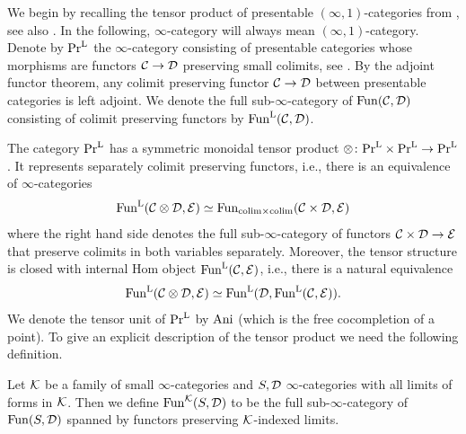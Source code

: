 We begin by recalling the tensor product of presentable $(\infty,1)$-categories from \cite[Section 4.8.1]{Lurie2017},
see also \cite[Section 0713]{Kerodon2026}.
In the following, $\infty$-category will always mean $(\infty,1)$-category.
Denote by $\mathrm{Pr}^\mathrm{L}$ the $\infty$-category consisting of presentable categories
whose morphisms are functors $\mathcal{C}\to\mathcal{D}$ preserving small colimits, see \cite[Section 5.5]{Lurie2009}.
By the adjoint functor theorem, any colimit preserving functor $\mathcal{C}\to\mathcal{D}$ between presentable categories is left adjoint.
We denote the full sub-$\infty$-category of $\operatorname{Fun}(\mathcal{C},\mathcal{D})$ consisting of colimit preserving functors by $\operatorname{Fun}^{\mathrm{L}}(\mathcal{C},\mathcal{D})$.

The category $\mathrm{Pr}^\mathrm{L}$ has a symmetric monoidal tensor product $\otimes\colon\mathrm{Pr}^\mathrm{L}\times\mathrm{Pr}^\mathrm{L}\to\mathrm{Pr}^\mathrm{L}$.
It represents separately colimit preserving functors, i.e., there is an equivalence of $\infty$-categories
\[
    \operatorname{Fun}^{\mathrm{L}}(\mathcal{C}\otimes\mathcal{D},\mathcal{E}) \simeq \operatorname{Fun}_{\mathrm{colim}\times\mathrm{colim}}(\mathcal{C}\times\mathcal{D},\mathcal{E})
\]
where the right hand side denotes the full sub-$\infty$-category of functors $\mathcal{C}\times\mathcal{D}\to\mathcal{E}$
that preserve colimits in both variables separately.
Moreover, the tensor structure is closed with internal Hom object $\operatorname{Fun}^{\mathrm{L}}(\mathcal{C},\mathcal{E})$,
i.e., there is a natural equivalence
\[
    \operatorname{Fun}^{\mathrm{L}}(\mathcal{C}\otimes\mathcal{D},\mathcal{E}) \simeq \operatorname{Fun}^{\mathrm{L}}(\mathcal{D},\operatorname{Fun}^{\mathrm{L}}(\mathcal{C},\mathcal{E})).
\]
We denote the tensor unit of $\mathrm{Pr}^\mathrm{L}$ by $\mathrm{Ani}$ (which is the free cocompletion of a point).
To give an explicit description of the tensor product we need the following definition.

\begin{definition}\label{def:cont-fun}
Let $\mathcal{K}$ be a family of small $\infty$-categories and $S,\mathcal{D}$ $\infty$-categories with all limits of forms in $\mathcal{K}$.
Then we define $\operatorname{Fun}^{\mathcal{K}}(S,\mathcal{D})$ to be the full sub-$\infty$-category of $\operatorname{Fun}(S,\mathcal{D})$ spanned by functors preserving $\mathcal{K}$-indexed limits.
\end{definition}

